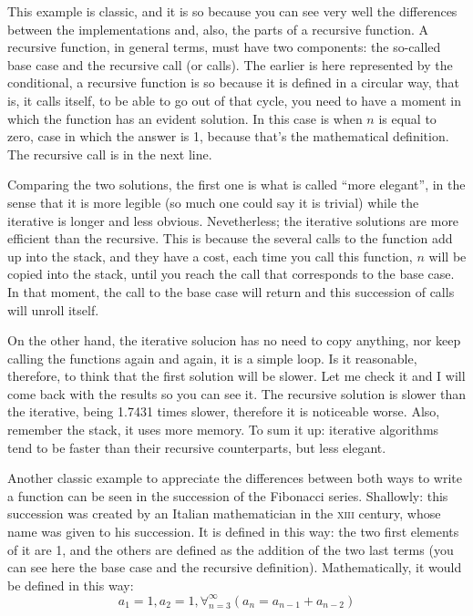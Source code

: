 \documentclass[a4paper]{article}
\begin{document}
This example is classic, and it is so because you can see very well the
differences between the implementations and, also, the parts of a recursive
function. A recursive function, in general terms, must have two components:
the so-called base case and the recursive call (or calls).
The earlier is here represented by the conditional, a recursive function is
so because it is defined in a circular way, that is, it calls itself, to be able
to go out of that cycle, you need to have a moment in which the function has an
evident solution. In this case is when $n$ is equal to zero, case in which the
answer is 1, because that's the mathematical definition. The recursive call is
in the next line.

Comparing the two solutions, the first one is what is called ``more elegant'',
in the sense that it is more legible (so much one could say it is trivial) while
the iterative is longer and less obvious. Nevetherless; the iterative solutions
are more efficient than the recursive. This is because the several calls to the
function add up into the stack, and they have a cost, each time you call this
function, $n$ will be copied into the stack, until you reach the call that
corresponds to the base case. In that moment, the call to the base case will
return and this succession of calls will unroll itself.

On the other hand, the iterative solucion has no need to copy anything,
nor keep calling the functions again and again, it is a simple loop. Is it
reasonable, therefore, to think that the first solution will be slower. Let me
check it and I will come back with the results so you can see it. The
recursive solution is slower than the iterative, being 1.7431 times slower,
therefore it is noticeable worse. Also, remember the stack, it uses more memory.
To sum it up: iterative algorithms tend to be faster than their recursive
counterparts, but less elegant.

Another classic example to appreciate the differences between both ways to write
a function can be seen in the succession of the Fibonacci series. Shallowly:
this succession was created by an Italian mathematician in the \textsc{xiii}
century, whose name was given to his succession. It is defined in this way:
the two first elements of it are 1, and the others are defined as the addition
of the two last terms (you can see here the base case and the recursive
definition). Mathematically, it would be defined in this way:
$$
a_1 = 1, a_2 = 1, \forall_{n=3}^{\infty}\left(a_n = a_{n-1} + a_{n-2}\right)
$$
\end{document}
